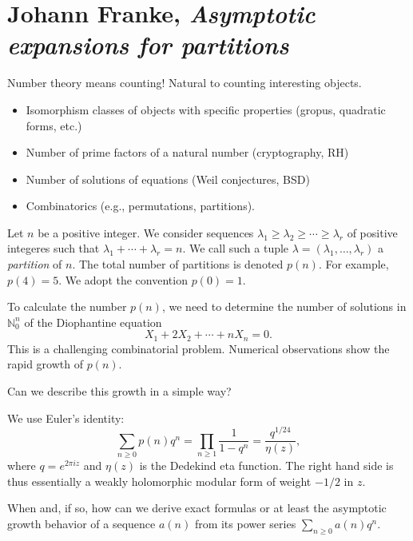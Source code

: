 \documentclass[reqno]{amsart} 
\numberwithin{theorem}{section}
\numberwithin{equation}{section}
\begin{document}
\section{Johann Franke, \emph{Asymptotic expansions for partitions}}

Number theory means counting!  Natural to counting interesting objects.
\begin{itemize}
\item Isomorphism classes of objects with specific properties (gropus, quadratic forms, etc.)
\item Number of prime factors of a natural number (cryptography, RH)
\item Number of solutions of equations (Weil conjectures, BSD)
\item Combinatorics (e.g., permutations, partitions).
\end{itemize}

Let $n$ be a positive integer.  We consider sequences $\lambda_1 \geq \lambda_2 \geq \dotsb \geq \lambda_r$ of positive integeres such that $\lambda_1 + \dotsb + \lambda_r = n$.  We call such a tuple $\lambda =(\lambda_1, \dotsc, \lambda_r)$ a \emph{partition} of $n$.  The total number of partitions is denoted $p(n)$.  For example, $p(4) = 5$.  We adopt the convention $p(0) = 1$.

To calculate the number $p(n)$, we need to determine the number of solutions in $\mathbb{N}_0^n$ of the Diophantine equation
\begin{equation*}
  X_1 + 2 X_2 + \dotsb + n X_n = 0.
\end{equation*}
This is a challenging combinatorial problem.  Numerical observations show the rapid growth of $p(n)$.
\begin{question}
  Can we describe this growth in a simple way?
\end{question}

We use Euler's identity:
\begin{equation*}
  \sum_{n \geq 0} p(n) q^n = \prod_{n \geq 1} \frac{1}{1 - q^n}
  = \frac{q^{1/24}}{ \eta(z)},
\end{equation*}
where $q = e^{2 \pi i z}$ and $\eta(z)$ is the Dedekind eta function.  The right hand side is thus essentially a weakly holomorphic modular form of weight $-1/2$ in $z$.

\begin{question}
  When and, if so, how can we derive exact formulas or at least the asymptotic growth behavior of a sequence $a(n)$ from its power series $\sum_{n \geq 0} a(n) q^n$.
\end{question}
\end{document}

